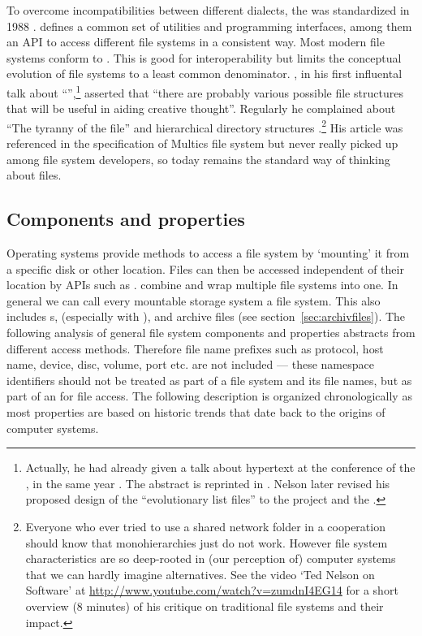 To overcome incompatibilities between different  dialects, the
 was standardized in 1988
\cite{POSIX1988}.  defines a common set of utilities and
programming interfaces, among them an API to access different file systems in a
consistent way. Most modern file systems conform to . This is good
for interoperability but limits the conceptual evolution of file systems to a
least common denominator. \textcite{Nelson1965}, in his first influental talk
about ``'',\footnote{Actually, he had already given a talk
about hypertext at the conference of the , in the same year \cite{Nelson1965a}.  The
abstract is reprinted in \textcite[p. 154]{Nelson2010}. Nelson later revised
his proposed design of the ``evolutionary list files'' to the 
project and the .}  asserted that ``there are probably
various possible file structures that will be useful in aiding creative
thought''.  Regularly he complained about ``The tyranny of the file'' and
hierarchical directory structures \cite{Nelson1986}.\footnote{Everyone who ever
tried to use a shared network folder in a cooperation should know that
monohierarchies just do not work.  However file system characteristics are so
deep-rooted in (our perception of) computer systems that we can hardly imagine
alternatives. See the video `Ted Nelson on Software' at
\url{http://www.youtube.com/watch?v=zumdnI4EG14} for a short overview (8
minutes) of his critique on traditional file systems and their impact.} His
article was referenced in the specification of Multics file system
\cite{Daley1965} but never really picked up among file system developers, so
today  remains the standard way of thinking about files.


\subsection{Components and properties}

Operating systems provide methods to access a file system by `mounting' it from
a specific disk or other location. Files can then be accessed independent of
their location by APIs such as .  combine and wrap multiple file systems into one.  In general we
can call every mountable storage system a file system.  This also includes
s,  (especially with ),
and archive files (see section~\ref{sec:archivfiles}).  The following analysis
of general file system components and properties abstracts from different
access methods. Therefore file name prefixes such as protocol, host name,
device, disc, volume, port etc.  are not included --- these namespace
identifiers should not be treated as part of a file system and its file names,
but as part of an  for file access.  The following description is
organized chronologically as most properties are based on historic trends that
date back to the origins of computer systems.

